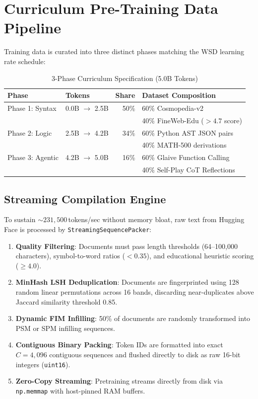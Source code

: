 \documentclass[10pt,twocolumn,letterpaper]{article}
\begin{document}
\section{Curriculum Pre-Training Data Pipeline}

Training data is curated into three distinct phases matching the WSD learning rate schedule:

\begin{table}[h]
\centering
\small
\caption{3-Phase Curriculum Specification (5.0B Tokens)}
\label{tab:curriculum}
\begin{tabular}{@{}llrl@{}}
\toprule
\textbf{Phase} & \textbf{Tokens} & \textbf{Share} & \textbf{Dataset Composition} \\
\midrule
Phase 1: Syntax & 0.0B $\to$ 2.5B & 50\% & 60\% Cosmopedia-v2 \\
& & & 40\% FineWeb-Edu ($>4.7$ score) \\
Phase 2: Logic & 2.5B $\to$ 4.2B & 34\% & 60\% Python AST JSON pairs \\
& & & 40\% MATH-500 derivations \\
Phase 3: Agentic & 4.2B $\to$ 5.0B & 16\% & 60\% Glaive Function Calling \\
& & & 40\% Self-Play CoT Reflections \\
\bottomrule
\end{tabular}
\end{table}

\subsection{Streaming Compilation Engine}
To sustain $\sim 231,500$\,tokens/sec without memory bloat, raw text from Hugging Face is processed by \texttt{StreamingSequencePacker}:
\begin{enumerate}
    \item \textbf{Quality Filtering}: Documents must pass length thresholds (64--100,000 characters), symbol-to-word ratios ($<0.35$), and educational heuristic scoring ($\ge 4.0$).
    \item \textbf{MinHash LSH Deduplication}: Documents are fingerprinted using 128 random linear permutations across 16 bands, discarding near-duplicates above Jaccard similarity threshold 0.85.
    \item \textbf{Dynamic FIM Infilling}: 50\% of documents are randomly transformed into PSM or SPM infilling sequences.
    \item \textbf{Contiguous Binary Packing}: Token IDs are formatted into exact $C = 4,096$ contiguous sequences and flushed directly to disk as raw 16-bit integers (\texttt{uint16}).
    \item \textbf{Zero-Copy Streaming}: Pretraining streams directly from disk via \texttt{np.memmap} with host-pinned RAM buffers.
\end{enumerate}
\end{document}
